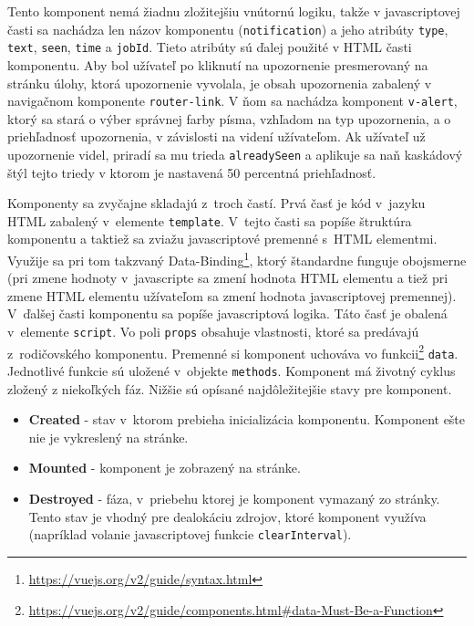 \documentclass[zadani,slovak]{fitthesis}
\begin{document}
Tento komponent nemá žiadnu zložitejšiu vnútornú logiku, takže v javascriptovej časti sa nachádza len názov komponentu (\texttt{notification}) a jeho atribúty \texttt{type}, \texttt{text}, \texttt{seen}, \texttt{time} a \texttt{jobId}. Tieto atribúty sú ďalej použité v HTML časti komponentu. Aby bol užívateľ po kliknutí na upozornenie presmerovaný na stránku úlohy, ktorá upozornenie vyvolala, je obsah upozornenia zabalený v navigačnom komponente \texttt{router-link}. V ňom sa nachádza komponent \texttt{v-alert}, ktorý sa stará o výber správnej farby písma, vzhľadom na typ upozornenia, a o priehľadnosť upozornenia, v závislosti na videní užívateľom. Ak užívateľ už upozornenie videl, priradí sa mu trieda \texttt{alreadySeen} a aplikuje sa naň kaskádový štýl tejto triedy v ktorom je nastavená 50 percentná priehľadnosť.



\noindent
Komponenty sa zvyčajne skladajú z~troch častí. Prvá časť je kód v~jazyku HTML zabalený v~elemente \texttt{template}. V~tejto časti sa popíše štruktúra komponentu a taktiež sa zviažu javascriptové premenné s~HTML elementmi. Využije sa pri tom takzvaný Data-Binding\footnote{\url{https://vuejs.org/v2/guide/syntax.html}}, ktorý štandardne funguje obojsmerne (pri zmene hodnoty v~javascripte sa zmení hodnota HTML elementu a tiež pri zmene HTML elementu užívateľom sa zmení hodnota javascriptovej premennej). V~ďalšej časti komponentu sa popíše javascriptová logika. Táto časť je obalená v~elemente \texttt{script}. Vo poli \texttt{props} obsahuje vlastnosti, ktoré sa predávajú z~rodičovského komponentu. Premenné si komponent uchováva vo funkcii\footnote{\url{https://vuejs.org/v2/guide/components.html\#data-Must-Be-a-Function}} \texttt{data}. Jednotlivé funkcie sú uložené v~objekte \texttt{methods}. Komponent má životný cyklus zložený z niekoľkých fáz. Nižšie sú opísané najdôležitejšie stavy pre komponent.
\begin{itemize}
    \item \textbf{Created} - stav v~ktorom prebieha inicializácia komponentu. Komponent ešte nie je vykreslený na stránke.
    \item \textbf{Mounted} - komponent je zobrazený na stránke.
    \item \textbf{Destroyed} - fáza, v~priebehu ktorej je komponent vymazaný zo stránky. Tento stav je vhodný pre dealokáciu zdrojov, ktoré komponent využíva (napríklad volanie javascriptovej funkcie \texttt{clearInterval}).
\end{itemize}
\end{document}
